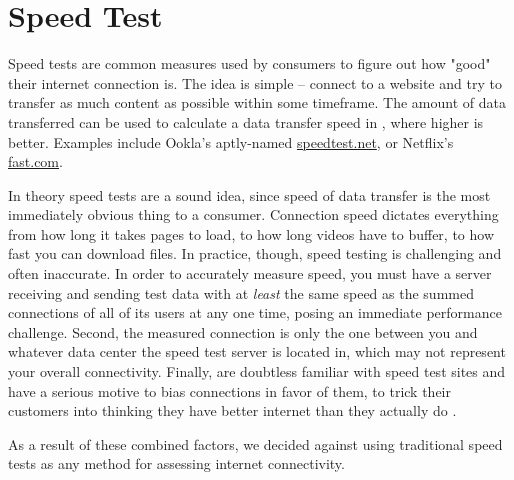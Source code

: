\section{Speed Test}\label{sec:speed_test_background}

Speed tests are common measures used by consumers to figure out how "good" their internet connection is. The idea is simple -- connect to a website and try to transfer as much content as possible within some timeframe. The amount of data transferred can be used to calculate a data transfer speed in \Mbps, where higher is better. Examples include Ookla's aptly-named \url{speedtest.net}, or Netflix's \url{fast.com}.

In theory speed tests are a sound idea, since speed of data transfer is the most immediately obvious thing to a consumer. Connection speed dictates everything from how long it takes pages to load, to how long videos have to buffer, to how fast you can download files. In practice, though, speed testing is challenging and often inaccurate. In order to accurately measure speed, you must have a server receiving and sending test data with at \textit{least} the same speed as the summed connections of all of its users at any one time, posing an immediate performance challenge. Second, the measured connection is only the one between you and whatever data center the speed test server is located in, which may not represent your overall connectivity. Finally, \isps are doubtless familiar with speed test sites and have a serious motive to bias connections in favor of them, to trick their customers into thinking they have better internet than they actually do \cite{SpeedtestComcast2020}.

As a result of these combined factors, we decided against using traditional speed tests as any method for assessing internet connectivity.
